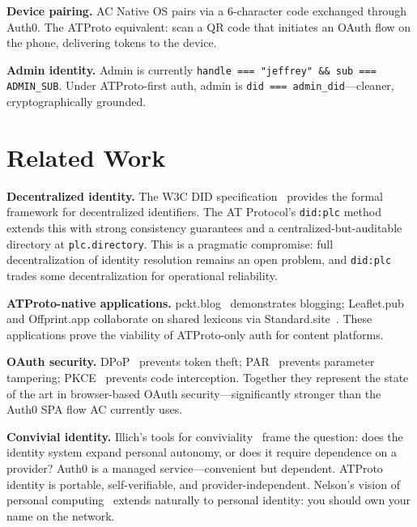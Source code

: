 \documentclass[10pt,letterpaper,twocolumn]{article}
\begin{document}
\textbf{Device pairing.} AC Native OS pairs via a 6-character code exchanged through Auth0. The ATProto equivalent: scan a QR code that initiates an OAuth flow on the phone, delivering tokens to the device.

\textbf{Admin identity.} Admin is currently \texttt{handle === "jeffrey" \&\& sub === ADMIN\_SUB}. Under ATProto-first auth, admin is \texttt{did === admin\_did}---cleaner, cryptographically grounded.


\section{Related Work}
\label{sec:related}

\textbf{Decentralized identity.} The W3C DID specification~\citep{w3cdid2022} provides the formal framework for decentralized identifiers. The AT Protocol's \texttt{did:plc} method~\citep{atproto2024did} extends this with strong consistency guarantees and a centralized-but-auditable directory at \texttt{plc.directory}. This is a pragmatic compromise: full decentralization of identity resolution remains an open problem, and \texttt{did:plc} trades some decentralization for operational reliability.

\textbf{ATProto-native applications.} pckt.blog~\citep{pcktblog2025} demonstrates blogging; Leaflet.pub and Offprint.app collaborate on shared lexicons via Standard.site~\citep{standardsite2025}. These applications prove the viability of ATProto-only auth for content platforms.

\textbf{OAuth security.} DPoP~\citep{rfc9449dpop} prevents token theft; PAR~\citep{rfc9126par} prevents parameter tampering; PKCE~\citep{rfc7636pkce} prevents code interception. Together they represent the state of the art in browser-based OAuth security---significantly stronger than the Auth0 SPA flow AC currently uses.

\textbf{Convivial identity.} Illich's tools for conviviality~\citep{illich1973tools} frame the question: does the identity system expand personal autonomy, or does it require dependence on a provider? Auth0 is a managed service---convenient but dependent. ATProto identity is portable, self-verifiable, and provider-independent. Nelson's vision of personal computing~\citep{nelson1974computerlib} extends naturally to personal identity: you should own your name on the network.

\end{document}
